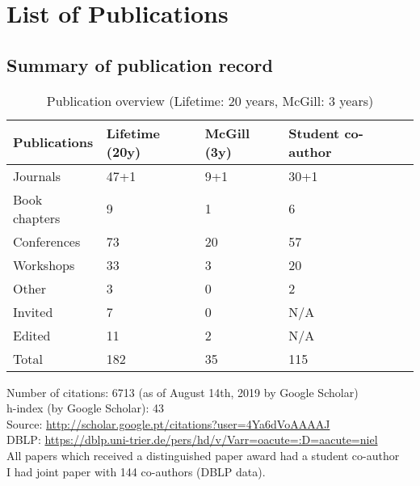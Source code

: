 \section{List of Publications}
\label{sec:publication-list}


\subsection{Summary of publication record}

\begin{table}[htb]
\begin{tabular}{@{}lllll@{}}
\toprule
\textbf{Publications} & \textbf{Lifetime} (20y) & \textbf{McGill} (3y) & \textbf{Student co-author} \\ \midrule
Journals & 47+1 & 9+1 & 30+1 \\ %
Book chapters & 9 & 1 & 6  \\ %
Conferences & 73 & 20 & 57  \\ %
Workshops & 33 & 3 & 20  \\ %
Other & 3 & 0 & 2  \\ %
Invited & 7 & 0 & N/A   \\ %
Edited & 11 & 2 & N/A \\ \midrule
Total & 182 & 35 & 115 \\ %
\bottomrule
\end{tabular}
\caption{Publication overview (Lifetime: 20 years, McGill: 3 years)}
\label{tab:publication-overview}
\end{table}


Number of citations: 6713 (as of August 14th, 2019 by Google Scholar) \\
h-index (by Google Scholar): 43 \\
Source: \url{http://scholar.google.pt/citations?user=4Ya6dVoAAAAJ}  \\
DBLP: \url{https://dblp.uni-trier.de/pers/hd/v/Varr=oacute=:D=aacute=niel}  \\
All papers which received a distinguished paper award had a student co-author \\
I had joint paper with 144 co-authors (DBLP data). \\


